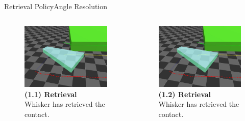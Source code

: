 \documentclass[AIRbeamer
,optEnglish
,optBiber
,optBibstyleAlphabetic
,optBeamerClassicFormat%
]{AIRlatex}
\begin{document}
    \begin{frame}[c]{Retrieval Policy}{Angle Resolution}
        \begin{columns}[T,onlytextwidth]
            \begin{column}[T]{0.48\textwidth}
                \begin{figure}[H]
                    \centering
                    \captionsetup{justification=centering}
                    \includegraphics[width=\textwidth]{figures/retrieval/retrieval}
                    \caption{\textbf{(1.1) Retrieval}\\Whisker has retrieved the contact.}
                \end{figure}

            \end{column}
            \begin{column}[T]{0.48\textwidth}
                \begin{figure}[H]
                    \centering
                    \captionsetup{justification=centering}
                    \includegraphics[width=\textwidth]{figures/retrieval/retrieval}
                    \caption{\textbf{(1.2) Retrieval}\\Whisker has retrieved the contact.}
                \end{figure}
            \end{column}
        \end{columns}
    \end{frame}
\end{document}
